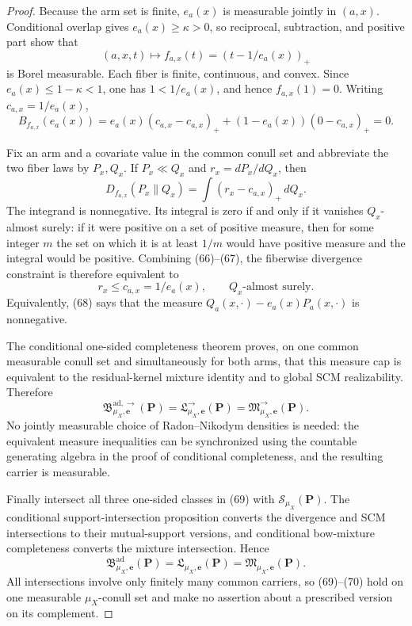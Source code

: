 \documentclass{article}
\begin{document}
\begin{proof}
Because the arm set is finite, \(e_a(x)\) is measurable jointly in \((a,x)\).  Conditional overlap gives \(e_a(x)\ge\kappa>0\), so reciprocal, subtraction, and positive part show that
\[
 (a,x,t)\longmapsto f_{a,x}(t)=(t-1/e_a(x))_+
\]
is Borel measurable.  Each fiber is finite, continuous, and convex.  Since \(e_a(x)\le1-\kappa<1\), one has \(1<1/e_a(x)\), and hence \(f_{a,x}(1)=0\).  Writing \(c_{a,x}=1/e_a(x)\),
\[
 B_{f_{a,x}}(e_a(x))
 =e_a(x)(c_{a,x}-c_{a,x})_+
  +(1-e_a(x))(0-c_{a,x})_+=0. \tag{66}
\]

Fix an arm and a covariate value in the common conull set and abbreviate the two fiber laws by \(P_x,Q_x\).  If \(P_x\ll Q_x\) and \(r_x=dP_x/dQ_x\), then
\[
 D_{f_{a,x}}(P_x\|Q_x)
 =\int(r_x-c_{a,x})_+\,dQ_x. \tag{67}
\]
The integrand is nonnegative.  Its integral is zero if and only if it vanishes \(Q_x\)-almost surely: if it were positive on a set of positive measure, then for some integer \(m\) the set on which it is at least \(1/m\) would have positive measure and the integral would be positive.  Combining (66)--(67), the fiberwise divergence constraint is therefore equivalent to
\[
 r_x\le c_{a,x}=1/e_a(x),\qquad Q_x\text{-almost surely}. \tag{68}
\]
Equivalently, (68) says that the measure \(Q_a(x,\cdot)-e_a(x)P_a(x,\cdot)\) is nonnegative.

The conditional one-sided completeness theorem proves, on one common measurable conull set and simultaneously for both arms, that this measure cap is equivalent to the residual-kernel mixture identity and to global SCM realizability.  Therefore
\[
 \mathfrak B^{\mathrm{ad},\to}_{\mu_X,\boldsymbol e}(\boldsymbol P)
 =\mathfrak L^{\to}_{\mu_X,\boldsymbol e}(\boldsymbol P)
 =\mathfrak M^{\to}_{\mu_X,\boldsymbol e}(\boldsymbol P). \tag{69}
\]
No jointly measurable choice of Radon--Nikodym densities is needed: the equivalent measure inequalities can be synchronized using the countable generating algebra in the proof of conditional completeness, and the resulting carrier is measurable.

Finally intersect all three one-sided classes in (69) with \(\mathcal S_{\mu_X}(\boldsymbol P)\).  The conditional support-intersection proposition converts the divergence and SCM intersections to their mutual-support versions, and conditional bow-mixture completeness converts the mixture intersection.  Hence
\[
 \mathfrak B^{\mathrm{ad}}_{\mu_X,\boldsymbol e}(\boldsymbol P)
 =\mathfrak L_{\mu_X,\boldsymbol e}(\boldsymbol P)
 =\mathfrak M_{\mu_X,\boldsymbol e}(\boldsymbol P). \tag{70}
\]
All intersections involve only finitely many common carriers, so (69)--(70) hold on one measurable \(\mu_X\)-conull set and make no assertion about a prescribed version on its complement.
\end{proof}
\end{document}
